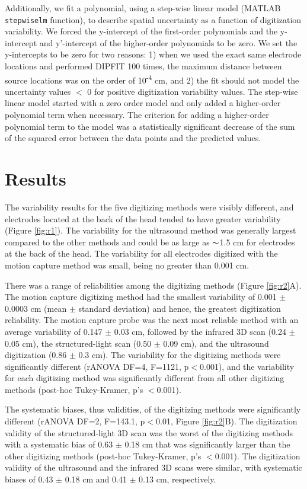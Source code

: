 \documentclass{UCF_ETD}
\newcommand{\tss}[1]{\textsuperscript{#1}}
\renewcommand{\ul}{}
\begin{document}
Additionally, we fit a polynomial, using a step-wise linear model (MATLAB {\tt stepwiselm} function), to describe spatial uncertainty as a function of digitization variability. We forced the y-intercept of the first-order polynomials and the y-intercept and y'-intercept of the higher-order polynomials to be zero. We set the y-intercepts to be zero for two reasons: 1) when we used the exact same electrode locations and performed DIPFIT 100 times, the maximum distance between source locations was on the order of 10\tss{-4} cm, and 2) the fit should not model the uncertainty values $<$ 0 for positive digitization variability values. The step-wise linear model started with a zero order model and only added a higher-order polynomial term when necessary. The criterion for adding a higher-order polynomial term to the model was a statistically significant decrease of the sum of the squared error between the data points and the predicted values.

\section{Results}

The variability \ul{results} for the five digitizing methods were visibly different, and electrodes located at the back of the head tended to have greater variability (Figure \ref{fig:r1}). The variability for the ultrasound method was generally largest compared to the other methods and could be as large as $\thicksim$1.5 cm for electrodes at the back of the head. The variability for all electrodes digitized with the motion capture method was small, being no greater than 0.001 cm. 

There was a range of reliabilities among the digitizing methods (Figure \ref{fig:r2}A). The motion capture digitizing method had the smallest variability of 0.001 $\pm$ 0.0003 cm (mean $\pm$ standard deviation) and hence, the greatest digitization reliability. The motion capture probe was the next most reliable method with an average variability of 0.147 $\pm$ 0.03 cm, followed by the infrared 3D scan (0.24 $\pm$ 0.05 cm), the structured-light scan (0.50 $\pm$ 0.09 cm), and the ultrasound digitization (0.86 $\pm$ 0.3 cm). The variability for the digitizing methods were significantly different (rANOVA \ul{DF=4, F=1121,} p$<$0.001), and the variability for each digitizing method was significantly different from all other digitizing methods (post-hoc Tukey-Kramer, p's $<$0.001). 

The systematic biases, thus validities, of the digitizing methods were significantly different (rANOVA \ul{DF=2, F=143.1,} p$<$0.01, Figure \ref{fig:r2}B). The digitization validity of the structured-light 3D scan was the worst of the digitizing methods with a systematic bias of 0.63 $\pm$ 0.18 cm that was significantly larger than the other digitizing methods (post-hoc Tukey-Kramer, p's $<$0.001). The digitization validity of the ultrasound and the infrared 3D scans were similar, with systematic biases of 0.43 $\pm$ 0.18 cm and 0.41 $\pm$ 0.13 cm, respectively.
\end{document}
